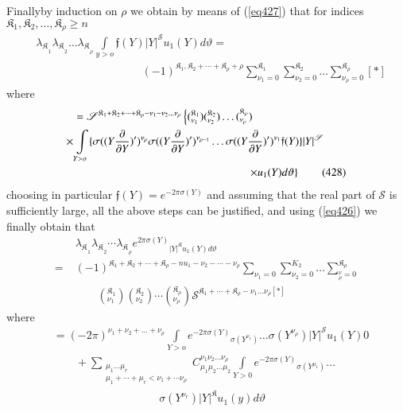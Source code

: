 Finally\pageoriginale by induction on $\rho$ we obtain by means of
(\ref{eq427}) that for indices $\mathfrak{K}_1 ,\mathfrak{K}_2
,\ldots, \mathfrak{K}_\rho \ge n$  
\begin{align*}
& \lambda{_\mathfrak{K}}_{_1} \lambda{_\mathfrak{K}}_{_2} \dots
\lambda{_\mathfrak{K}}_{_\rho} \int\limits_{y > o} \mathfrak{f} (Y)
|Y|^\mathscr{S} u_1 (Y) d \vartheta = \\ 
& \hspace{4cm} (-1)^{\mathfrak{K}_1, \mathfrak{K}_2 +\cdots+
  \mathfrak{K}_\rho + \rho} \sum_{\nu_1 = 0}^{\mathfrak{K}_1}
\sum_{\nu_2 = 0}^{\mathfrak{K}_2} \dots \sum_{\nu_\rho =
  0}^{\mathfrak{K}_\rho} [ * ]  
\end{align*}
where
\begin{align*}
[*] & = \mathscr{S}^{\mathfrak{K}_1 +\mathfrak{K}_2 +\cdots+
  \mathfrak{K}_\rho -\nu_1 - \nu_2 \dots \nu_\rho} \left\{
(^{\mathfrak{K}_1}_{\nu_1}) (^{\mathfrak{K}_2}_{\nu_2}) \dots
(^{\mathfrak{K}_\rho}_{\nu_\rho})  \right.\\
\times & \int\limits_{Y > o} \{ \sigma ((Y
\frac{\partial} {\partial Y})')^{\nu_\rho} \sigma ((Y \frac{\partial}
     {\partial Y})')^{\nu_{\rho -1}}  \dots \sigma ((Y \frac{\partial}
     {\partial Y})')^{\nu_1} \mathfrak{f} (Y)\} |Y|^\mathscr{S} \\
& \hspace{5.5cm} \left. \times  u_1 (Y) d \vartheta
     \right\}\tag{428}\label{eq428}  
\end{align*}
choosing in particular $\mathfrak{f} (Y) = e^{-2 \pi \sigma (Y)}$ and
assuming that the real part of $\mathscr{S}$ is sufficiently large,
all the above steps can be justified, and using (\ref{eq426}) we finally
obtain that  
\begin{align*}
& \lambda{_\mathfrak{K}}_{_1} \lambda{_\mathfrak{K}}_{_2} \cdots
\lambda{_\mathfrak{K}}_{_\rho} e^{2 \pi \sigma (Y)}{_{|Y|^\mathfrak{K}
    u_1 (Y) d \vartheta}}  \\
= \; &  (-1)^{\mathfrak{K}_1 + \mathfrak{K}_2 +\cdots+ \mathfrak{K}_\rho - nu_1
  -\nu_2 -\cdots- \nu_\rho }\sum_{\nu_1 = 0} \sum_{\nu_2 = 0}^{K_2}
\dots \sum_{^\nu_\rho=0}^{\mathfrak{K}_\rho} \\
& \qquad (^{\mathfrak{K}_1}_{\nu_1})
(^{\mathfrak{K}_2}_{\nu_2}) \cdots (^{\mathfrak{K}_\rho}_{\nu_\rho})
\mathscr{S} ^{\mathfrak{K}_1 +\cdots+ \mathfrak{K}_\rho -\nu_1 \dots
  \nu_\rho [*]}  
\end{align*}
where
\begin{align*} 
[*]&  = (-2 \pi) ^{\nu_1 + \nu_2 +\dots+ \nu_\rho} \int\limits_{Y > o} e
^{- 2 \pi \sigma (Y)}{_{\sigma (Y^{\nu_1})}} \dots \sigma
(Y^{\nu_\rho}) |Y|^\mathscr{S} u_1 (Y) 0 \\
& \qquad + \sum_{\substack{\mu_1 \dots
    \mu_r \\ \mu_1 +\cdots+\mu_r < \nu_1 + \cdots \nu_\rho}} C^{\nu_1
  \nu_2 \dots \nu_\rho} _{\mu_1 \mu_2 \dots \mu_2} \int\limits_{Y>
  0}e^{- 2 \pi \sigma (Y)}{_{\sigma (Y ^{\mu_1})}} \dots\\[4pt]
& \hspace{4cm} \sigma(Y^{\nu_r}) |Y|^\mathfrak{K} u_1(y) d
\vartheta \tag{429}\label{eq429}   
\end{align*}\pageoriginale

